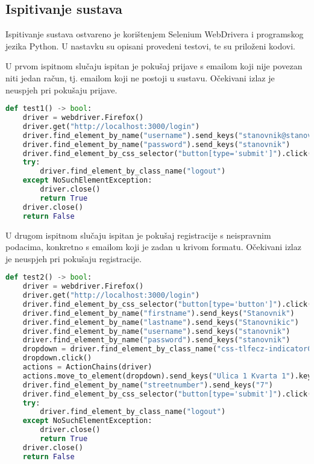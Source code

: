 			\subsection{Ispitivanje sustava}

			Ispitivanje sustava ostvareno je korištenjem Selenium WebDrivera i programskog jezika Python. U nastavku su opisani provedeni testovi, te su priloženi kodovi.

			U prvom ispitnom slučaju ispitan je pokušaj prijave s emailom koji nije povezan niti jedan račun, tj. emailom koji ne postoji u sustavu. Očekivani izlaz je neuspjeh pri pokušaju prijave.

			\begin{lstlisting}[language=Python, breaklines=true]
def test1() -> bool:
    driver = webdriver.Firefox()
    driver.get("http://localhost:3000/login")
    driver.find_element_by_name("username").send_keys("stanovnik@stanovnik.com")
    driver.find_element_by_name("password").send_keys("stanovnik")
    driver.find_element_by_css_selector("button[type='submit']").click()
    try:
        driver.find_element_by_class_name("logout")
    except NoSuchElementException:
        driver.close()
        return True
    driver.close()
    return False
			\end{lstlisting}

			U drugom ispitnom slučaju ispitan je pokušaj registracije s neispravnim podacima, konkretno s emailom koji je zadan u krivom formatu. Očekivani izlaz je neuspjeh pri pokušaju registracije.

			\begin{lstlisting}[language=Python, breaklines=true]
def test2() -> bool:
    driver = webdriver.Firefox()
    driver.get("http://localhost:3000/login")
    driver.find_element_by_css_selector("button[type='button']").click()
    driver.find_element_by_name("firstname").send_keys("Stanovnik")
    driver.find_element_by_name("lastname").send_keys("Stanovnikic")
    driver.find_element_by_name("username").send_keys("stanovnik")
    driver.find_element_by_name("password").send_keys("stanovnik")
    dropdown = driver.find_element_by_class_name("css-tlfecz-indicatorContainer")
    dropdown.click()
    actions = ActionChains(driver)
    actions.move_to_element(dropdown).send_keys("Ulica 1 Kvarta 1").key_down(Keys.ENTER).key_up(Keys.ENTER).perform()
    driver.find_element_by_name("streetnumber").send_keys("7")
    driver.find_element_by_css_selector("button[type='submit']").click()
    try:
        driver.find_element_by_class_name("logout")
    except NoSuchElementException:
        driver.close()
        return True
    driver.close()
    return False
			\end{lstlisting}

